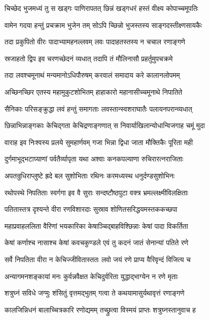 \twolineshloka
{चिच्छेद भुजमध्यं तु स खड्गः पाणिरापतत्}
{छिन्नं खड्गधरं हस्तं वीक्ष्य कोपाच्चमूपतिः}%

\twolineshloka
{वामेन गदया हन्तुं प्रचक्राम भुजेन तम्}
{सोऽपि च्छिन्नो भुजस्तस्य साङ्गदस्तीक्ष्णसायकैः}%

\twolineshloka
{तदा प्रकुपितो वीरः पादाभ्यामहनल्लवम्}
{लवः पादाहतस्तस्य न चचाल रणाङ्गणे}%

\twolineshloka
{स्रजाहतो द्विप इव चरणच्छेदनं व्यधात्}
{तदापि तं मौलिनासौ प्रहर्तुमुपचक्रमे}%

\twolineshloka
{तदा लवश्चमूनाथं मन्यमानोऽधिपौरुषम्}
{करवालं समादाय करे कालानलोपमम्}%

\twolineshloka
{अच्छिनच्छिर एतस्य महामुकुटशोभितम्}
{हाहाकारो महानासीच्चमूनाथे निपातिते}%

\twolineshloka
{सैनिकाः परिसङ्क्रुद्धा लवं हन्तुं समागताः}
{लवस्तान्स्वशराघातैः पलायनपरान्व्यधात्}%

\twolineshloka
{छिन्नाभिन्नाङ्गकाः केचिद्गता केचिद्रणाङ्गणात्}
{स निवार्याखिलान्योधान्विजगाह चमूं मुदा}%

\twolineshloka
{वाराह इव निःश्वस्य प्रलये सुमहार्णवम्}
{गजा भिन्ना द्विधा जाता मौक्तिकैः पूरिता मही}%

\twolineshloka
{दुर्गमाभूद्भटाग्र्याणां पर्वतैर्व्यापृता यथा}
{अश्वाः कनकपल्याणा रुचिरारत्नराजिताः}%

\twolineshloka
{अपतन्रुधिराप्लुष्टे ह्रदे बल सुशोभिताः}
{रथिनः करमध्यस्थ धनुर्दण्डसुशोभिनः}%

\twolineshloka
{रथोपस्थे निपतिताः स्वर्गगा इव वै सुराः}
{सन्दष्टौष्ठपुटा वक्त्र भ्रमल्लक्ष्मीविलक्षिताः}%

\twolineshloka
{पतितास्तत्र दृश्यन्ते वीरा रणविशारदाः}
{सुस्राव शोणितसरिद्धयमस्तककच्छपा}%

\twolineshloka
{महाप्रवाहललिता वैरिणां भयकारिका}
{केषाञ्चिद्बाहविश्छिन्नाः केषां पादा विकर्तिता}%

\twolineshloka
{केषां कर्णाश्च नासाश्च केषां कवचकुण्डले}
{एवं तु कदनं जातं सेनान्यां पतिते रणे}%

\twolineshloka
{सर्वे निपतिता वीरा न केचिज्जीवितास्ततः}
{लवो जयं रणे प्राप्य वैरिवृन्दं विजित्य च}%

\twolineshloka
{अन्यागमनशङ्कायां मनः कुर्वन्नवैक्षत}
{केचिदुर्वरिता युद्धाद्भाग्येन न रणे मृताः}%

\twolineshloka
{शत्रुघ्नं सविधे जग्मुः शंसितुं वृत्तमद्भुतम्}
{गत्वा ते कथयामासुर्यथावृत्तं रणाङ्गणे}%

\twolineshloka
{कालजिन्निधनं बालाच्चित्रकारि रणोद्यमम्}
{तच्छ्रुत्वा विस्मयं प्राप्तः शत्रुघ्नस्तानुवाच ह}%

